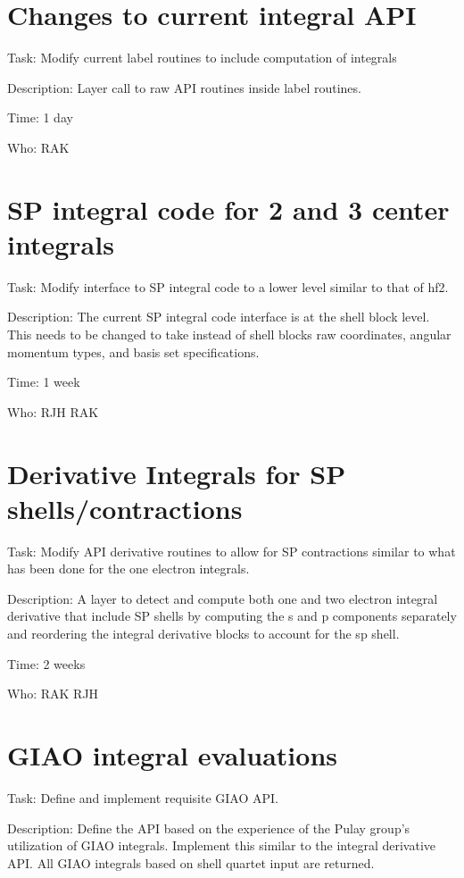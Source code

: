 \section{Changes to current integral API}
Task: Modify current label routines to include computation of integrals

Description:  Layer call to raw API routines inside label routines.  

Time: 1 day

Who: RAK

\section{SP integral code for 2 and 3 center integrals}
Task: Modify interface to SP integral code to a lower level similar to
that of hf2.  

Description:  The current SP integral code interface is at the shell
block level.  This needs to be changed to take instead of shell blocks
raw coordinates, angular momentum types, and basis set specifications.

Time: 1 week

Who: RJH RAK


\section{Derivative Integrals for SP shells/contractions}

Task: Modify API derivative routines to allow for SP contractions
similar to what has been done for the one electron integrals.  

Description:  A layer to detect and compute both one and two electron
integral derivative that include SP shells by computing the s and p
components separately and reordering the integral derivative blocks to
account for the sp shell.  

Time: 2 weeks

Who: RAK RJH


\section{GIAO integral evaluations}
Task: Define and implement requisite GIAO API.

Description:  Define the API based on the experience of the Pulay
group's utilization of GIAO integrals.  Implement this similar to the
integral derivative API.  All GIAO integrals based on shell quartet
input are returned.  

